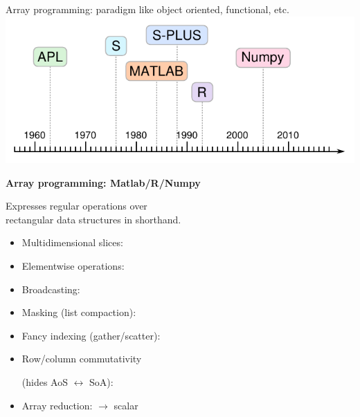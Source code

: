 \documentclass[aspectratio=169]{beamer}
\begin{document}
\begin{frame}[fragile]{Array programming: paradigm like object oriented, functional, etc.}
\vspace{0.15 cm}
\hfill \includegraphics[height=2.75 cm]{apl-timeline.pdf}

\vspace{-2.15 cm}
{\bf\large Array programming: Matlab/R/Numpy}

\vspace{0.5 cm}
Expresses regular operations over \\ rectangular data structures in shorthand.

\vspace{0.25 cm}
\begin{itemize}\setlength{\itemsep}{0.15 cm}
\item Multidimensional slices: 
\item Elementwise operations: 
\item Broadcasting: 
\item Masking (list compaction): 
\item Fancy indexing (gather/scatter): 
\item Row/column commutativity 

(hides AoS $\leftrightarrow$ SoA): 
\item Array reduction:  $\to$ scalar
\end{itemize}
\end{frame}
\end{document}
